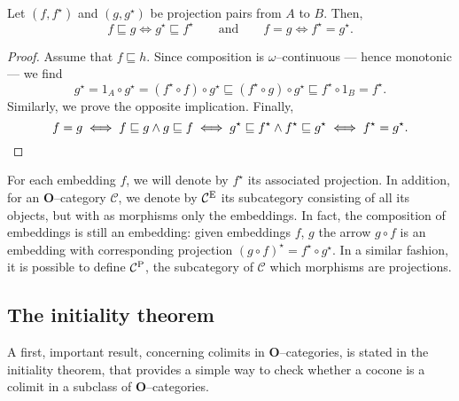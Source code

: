 \begin{lem}
  Let \((f,f^\star)\) and \((g,g^\star)\) be projection pairs from \(A\) to \(B\).
  Then,
  \begin{equation*}
    f \sqsubseteq g \iff g^\star \sqsubseteq f^\star \qquad \text{and} \qquad
    f = g \iff f^\star = g^\star.
  \end{equation*}
\end{lem}
\begin{proof}
  Assume that \(f \sqsubseteq h\). Since composition is \(\omega{}\)--continuous --- hence monotonic --- we find
  \begin{equation*}
    g^\star = 1_A \circ g^\star = (f^\star \circ f) \circ g^\star
    \sqsubseteq (f^\star \circ g) \circ g^\star \sqsubseteq f^\star \circ 1_B = f^\star.
  \end{equation*}
  Similarly, we prove the opposite implication. Finally,
  \begin{equation*}
    f = g \iff f \sqsubseteq g \land g \sqsubseteq f
    \iff g^\star \sqsubseteq f^\star \land f^\star \sqsubseteq g^\star \iff f^\star = g^\star.\qedhere
  \end{equation*}
\end{proof}

For each embedding \(f\), we will denote by \(f^\star\) its associated projection. %
In addition, for an \(\mathbf{O}\)--category \(\mathcal{C}\), we denote by \(\mathcal{C}^\textup{E}\) its subcategory consisting of all its objects, but with as morphisms only the embeddings.
In fact, the composition of embeddings is still an embedding: given embeddings \(f\), \(g\) the arrow \(g \circ f\) is an embedding with corresponding projection \({(g \circ f)}^\star = f^\star \circ g^\star\).%
In a similar fashion, it is possible to define \(\mathcal{C}^\textup{P}\), the subcategory of \(\mathcal{C}\) which morphisms are projections.

\subsection{The initiality theorem}

A first, important result, concerning colimits in \(\mathbf{O}\)--categories, is stated in the initiality theorem, that provides a simple way to check whether a cocone is a colimit in a subclass of \(\mathbf{O}\)--categories.

